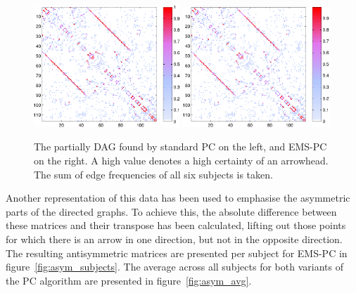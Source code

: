 \documentclass[a4paper, english]{article}
\begin{document}
\begin{figure}[h!]
  \centering
  \includegraphics[width=0.49\textwidth]{images/new/PDAG_avg_mod-crop}
  \includegraphics[width=0.49\textwidth]{images/new/PDAG_avg_expl-crop}
  \caption{The partially DAG found by standard PC on the left, and EMS-PC on the right. A high value denotes a high certainty of an arrowhead. The sum of edge frequencies of all six subjects is taken.}
  \label{fig:pdag_avg}
\end{figure}

Another representation of this data has been used to emphasise the asymmetric parts of the directed graphs.
To achieve this, the absolute difference between these matrices and their transpose has been calculated, lifting out those points for which there is an arrow in one direction, but not in the opposite direction.
The resulting antisymmetric matrices are presented per subject for EMS-PC in figure~\ref{fig:asym_subjects}. The average across all subjects for both variants of the PC algorithm are presented in figure~\ref{fig:asym_avg}.
\end{document}
